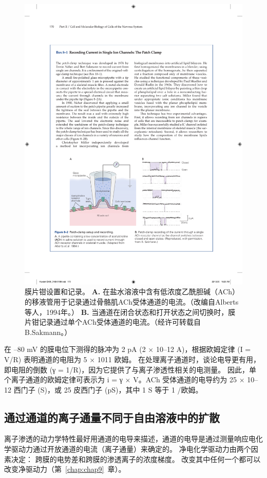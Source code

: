 \begin{figure}[htbp]
	\centering
	\includegraphics[width=0.8\linewidth]{chap08/fig_8_2}
	\caption{膜片钳设置和记录。
	\textbf{A.} 在盐水溶液中含有低浓度乙酰胆碱（ACh）的移液管用于记录通过骨骼肌ACh受体通道的电流。（改编自Alberts等人，1994年。）
	\textbf{B.} 当通道在闭合状态和打开状态之间切换时，膜片钳记录通过单个ACh受体通道的电流。（经许可转载自B.Sakmann。）}
	\label{fig:8_2}
\end{figure}



在 –80 mV 的膜电位下测得的脉冲为 2 pA (2 × 10–12 A)，根据欧姆定律 (I = V/R) 表明通道的电阻为 5 × 1011 欧姆。
在处理离子通道时，谈论电导更有用，即电阻的倒数 (γ = 1/R)，因为它提供了与离子渗透性相关的电测量。
因此，单个离子通道的欧姆定律可表示为 i = γ × V。ACh 受体通道的电导约为 25 × 10–12 西门子 (S)，或 25 皮西门子 (pS)，其中 1 S 等于 1 /欧姆。



\subsection{通过通道的离子通量不同于自由溶液中的扩散}

离子渗透的动力学特性最好用通道的电导来描述，通道的电导是通过测量响应电化学驱动力通过开放通道的电流（离子通量）来确定的。
净电化学驱动力由两个因素决定：
跨膜的电势差和跨膜的渗透离子的浓度梯度。
改变其中任何一个都可以改变净驱动力（第~\ref{chap:chap9}~章）。


